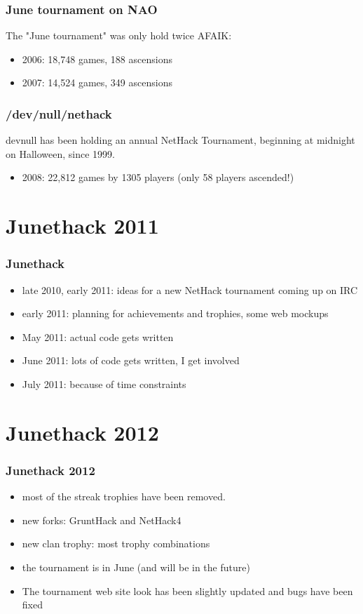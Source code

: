 \documentclass{beamer}
\begin{document}
\begin{frame}
\frametitle{June tournament on NAO}
  The "June tournament" was only hold twice AFAIK:\pause
  \begin{itemize}
    \item 2006: 18,748 games, 188 ascensions
    \item 2007: 14,524 games, 349 ascensions
  \end{itemize}
\end{frame}

\begin{frame}
\frametitle{/dev/null/nethack}
  devnull has been holding an annual NetHack Tournament, beginning at midnight on Halloween, since 1999.\pause
  \begin{itemize}[<+->]
    \item 2008: 22,812 games by 1305 players (only 58 players ascended!)
  \end{itemize}
\end{frame}

\section{Junethack 2011}
\begin{frame}
\frametitle{Junethack}
\begin{center}
  \begin{itemize}[<+->]
    \item late 2010, early 2011: ideas for a new NetHack tournament coming up on IRC
    \item early 2011: planning for achievements and trophies, some web mockups
    \item May 2011: actual code gets written
    \item June 2011: lots of code gets written, I get involved
    \item July 2011: because of time constraints %
  \end{itemize}
\end{center}
\end{frame}

\section{Junethack 2012}
\begin{frame}
\frametitle{Junethack 2012}
  \begin{itemize}[<+->]
    \item most of the streak trophies have been removed.
    \item new forks: GruntHack and NetHack4
    \item new clan trophy: most trophy combinations
    \item the tournament is in June (and will be in the future)
    \item The tournament web site look has been slightly updated and bugs have been fixed
  \end{itemize}
\end{frame}
\end{document}
